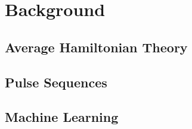 \chapter{Background}

\section{Average Hamiltonian Theory}

\section{Pulse Sequences}

\section{Machine Learning}
